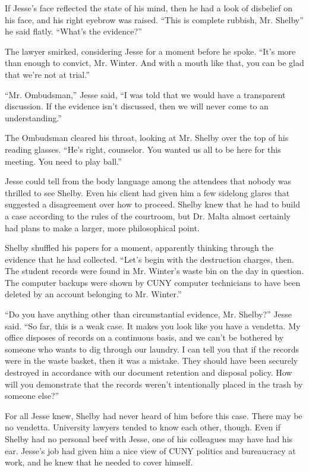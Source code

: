 \documentclass[12pt]{book}
\begin{document}
If Jesse's face reflected the state of his mind, then he had a look of disbelief on his face, and his right eyebrow was raised.  ``This is complete rubbish, Mr. Shelby'' he said flatly.  ``What's the evidence?''

The lawyer smirked, considering Jesse for a moment before he spoke.  ``It's more than enough to convict, Mr. Winter.  And with a mouth like that, you can be glad that we're not at trial.''

``Mr. Ombudsman,'' Jesse said, ``I was told that we would have a transparent discussion.  If the evidence isn't discussed, then we will never come to an understanding.''

The Ombudsman cleared his throat, looking at Mr. Shelby over the top of his reading glasses.  ``He's right, counselor.  You wanted us all to be here for this meeting.  You need to play ball.''

Jesse could tell from the body language among the attendees that nobody was thrilled to see Shelby.  Even his client had given him a few sidelong glares that suggested a disagreement over how to proceed.  Shelby knew that he had to build a case according to the rules of the courtroom, but Dr. Malta almost certainly had plans to make a larger, more philosophical point.

Shelby shuffled his papers for a moment, apparently thinking through the evidence that he had collected.  ``Let's begin with the destruction charges, then.  The student records were found in Mr. Winter's waste bin on the day in question.  The computer backups were shown by CUNY computer technicians to have been deleted by an account belonging to Mr. Winter.''

``Do you have anything other than circumstantial evidence, Mr. Shelby?'' Jesse said.  ``So far, this is a weak case.  It makes you look like you have a vendetta.  My office disposes of records on a continuous basis, and we can't be bothered by someone who wants to dig through our laundry.  I can tell you that if the records were in the waste basket, then it was a mistake.  They should have been securely destroyed in accordance with our document retention and disposal policy.  How will you demonstrate that the records weren't intentionally placed in the trash by someone else?''

For all Jesse knew, Shelby had never heard of him before this case.  There may be no vendetta.  University lawyers tended to know each other, though.  Even if Shelby had no personal beef with Jesse, one of his colleagues may have had his ear.  Jesse's job had given him a nice view of CUNY politics and bureaucracy at work, and he knew that he needed to cover himself.
\end{document}
